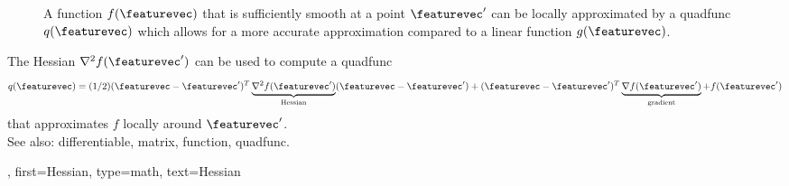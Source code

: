 {{\begin{figure}[H]
\begin{center}
		\vspace*{-5mm}
	\end{center}
	\caption{
		A \gls{function} $f(\featurevec)$ that is sufficiently \gls{smooth} at a 
		point $\featurevec'$ can be locally approximated by 
		a \gls{quadfunc} $q(\featurevec)$ which allows for a more accurate approximation 
		compared to a linear \gls{function} $g(\featurevec)$. \label{fig_quadapprox_hessian_dict}}
\end{figure}
		The Hessian $\nabla^2 f(\featurevec')$ can be used to compute a \gls{quadfunc} 
		$$q(\featurevec) = (1/2) (\featurevec- \featurevec')^{T} \underbrace{\nabla^2 f(\featurevec')}_{\text{Hessian}} 
		(\featurevec- \featurevec') +  (\featurevec- \featurevec')^{T} \underbrace{\nabla f(\featurevec')}_{\text{gradient}} 
		+ f(\featurevec')$$
		that approximates $f$ locally around $\featurevec'$. 
        		\\
		See also: \gls{differentiable}, \gls{matrix}, \gls{function}, \gls{quadfunc}. }, 
	first={Hessian},
	type=math,
	text={Hessian}
}

